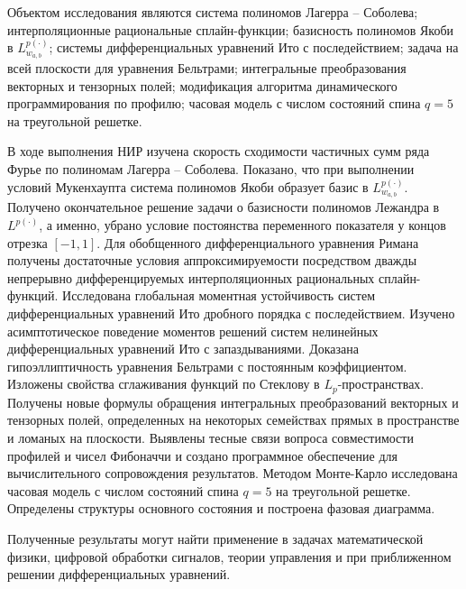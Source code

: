 


Объектом исследования являются система полиномов Лагерра -- Соболева; интерполяционные рациональные сплайн-функции;
базисность полиномов Якоби в $L^{p(\cdot)}_{w_{a,b}}$;
системы дифференциальных уравнений Ито с последействием;
задача на всей плоскости для уравнения Бельтрами;
интегральные преобразования векторных и тензорных полей;
модификация алгоритма динамического программирования по профилю;
часовая модель с числом состояний спина $q=5$ на треугольной решетке.

В ходе выполнения НИР изучена  скорость сходимости частичных сумм ряда Фурье по полиномам Лагерра -- Соболева.
Показано, что при выполнении условий Мукенхаупта система полиномов Якоби образует базис в $L^{p(\cdot)}_{w_{a,b}}$.
Получено окончательное решение задачи о базисности полиномов Лежандра в $L^{p(\cdot)}$, а именно, убрано условие постоянства переменного показателя у концов отрезка $[-1,1]$.
Для обобщенного дифференциального уравнения Римана получены достаточные условия аппроксимируемости посредством дважды непрерывно
 дифференцируемых интерполяционных рациональных сплайн-функций.
Исследована глобальная моментная устойчивость систем дифференциальных уравнений Ито дробного порядка с последействием. Изучено асимптотическое поведение моментов решений систем нелинейных дифференциальных уравнений Ито с запаздываниями.
Доказана гипоэллиптичность уравнения Бельтрами с постоянным коэффициентом. Изложены свойства сглаживания функций по Стеклову в $L_p$-пространствах.
Получены новые формулы обращения интегральных преобразований векторных и тензорных полей, определенных на некоторых семействах прямых в пространстве и ломаных на плоскости.
Выявлены тесные связи вопроса совместимости профилей и чисел Фибоначчи и создано программное обеспечение для вычислительного сопровождения результатов.
Методом Монте-Карло исследована часовая модель с числом состояний спина $q=5$ на треугольной решетке. Определены структуры основного состояния и построена фазовая диаграмма.

Полученные результаты могут найти применение в задачах математической физики, цифровой обработки сигналов, теории управления и при приближенном решении дифференциальных уравнений. 